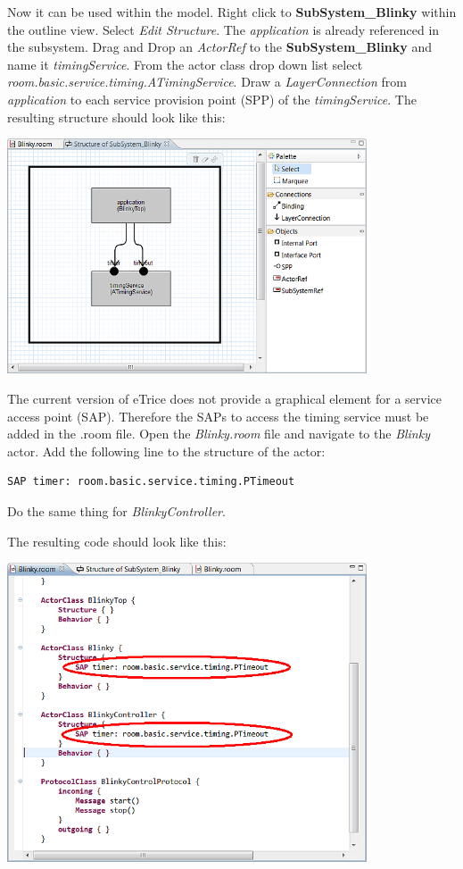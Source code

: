 Now it can be used within the model. Right click to \textbf{SubSystem\_Blinky} within the outline view. 
Select \textit{Edit Structure}. The \textit{application} is already referenced in the subsystem. Drag and 
Drop an \textit{ActorRef} to the \textbf{SubSystem\_Blinky} and name it \textit{timingService}. From the 
actor class drop down list select \textit{room.basic.service.timing.ATimingService}. Draw a 
\textit{LayerConnection} from \textit{application} to each service provision point (SPP) of the 
\textit{timingService}. The resulting structure should look like this:

\includegraphics[width=0.8\textwidth]{images/020-Blinky06.png}

The current version of eTrice does not provide a graphical element for a service access point (SAP). 
Therefore the SAPs to access the timing service must be added in the .room file. Open the 
\textit{Blinky.room} file and navigate to the \textit{Blinky} actor. Add the following line to the 
structure of the actor:

\begin{verbatim}SAP timer: room.basic.service.timing.PTimeout \end{verbatim}

Do the same thing for \textit{BlinkyController}.

The resulting code should look like this:

\includegraphics[width=0.8\textwidth]{images/020-Blinky07.png}


